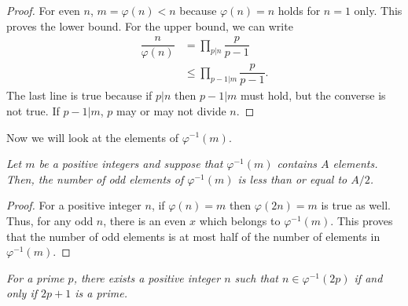 \documentclass{subfile}
\begin{document}
		\begin{proof}
			For even $n$, $m=\varphi(n)<n$ because $\varphi(n)=n$ holds for $n=1$ only. This proves the lower bound. For the upper bound, we can write
				\begin{align*}
					\dfrac{n}{\varphi(n)} & = \prod_{p|n}\dfrac{p}{p-1}\\
									  & \leq \prod_{p-1|m}\dfrac{p}{p-1}.
				\end{align*}
			The last line is true because if $p|n$ then $p-1|m$ must hold, but the converse is not true. If $p-1|m$, $p$ may or may not divide $n$.
		\end{proof}
	
	Now we will look at the elements of $\varphi^{-1}(m)$.
		\begin{theorem}\slshape
			Let $m$ be a positive integers and suppose that $\varphi^{-1}(m)$ contains $A$ elements. Then, the number of odd elements of $\varphi^{-1}(m)$ is less than or equal to $A/2$.
		\end{theorem}
		
		\begin{proof}
			For a positive integer $n$, if $\varphi(n)=m$ then $\varphi(2n)=m$ is true as well. Thus, for any odd $n$, there is an even $x$ which belongs to $\varphi^{-1}(m)$. This proves that the number of odd elements is at most half of the number of elements in $\varphi^{-1}(m)$.
		\end{proof}
		
		\begin{theorem}\slshape
			For a prime $p$, there exists a positive integer $n$ such that $n\in\varphi^{-1}(2p)$ if and only if $2p+1$ is a prime.
		\end{theorem}
		
\end{document}
